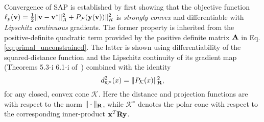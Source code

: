 \newcommand{\coneName}{\mathcal{K}}
\newcommand{\dist}{d}
\newcommand{\cond}{\text{cond}}
\newcommand{\vx}{\mf{v}}
\newcommand{\fx}{\ell_p(\mf{\vx})}

\newcommand{\vy}{\mf{u}}
\newcommand{\fy}{\ell_p(\mf{\vy})}
\newcommand{\vd}{\mf{d}}

\renewcommand\qedsymbol{$\IEEEQED$}

Convergence of SAP is established
by first showing that the objective function 
$\ell_p({\mathbf{v}}) = \frac{1}{2}\Vert{\mathbf{v}}-{\mathbf{v}}^*\Vert_{A}^2 + P_\mathcal{F}({\mathbf{y}}({\mathbf{v}}))\Vert_R^2$
is \emph{strongly convex}
and differentiable with \emph{Lipschitz continuous} gradients.  The
former property is inherited from the positive-definite quadratic term 
provided by the positive definite matrix ${\mathbf{A}}$ in Eq. \eqref{eq:primal_unconstrained}.  The latter is shown using differentiability of the squared-distance function
 and the Lipschitz continuity of its gradient map (Theorems 5.3-i 6.1-i of~\cite{bib:delfour2011shapes})
 combined with the identity
\[
  \dist^2_{\coneName^\circ}(x) = \|P_{\coneName}(x)\|_{\mf{R}}^2,
\] 
for any closed, convex cone $\coneName$. Here 
the distance and projection functions are with respect to the
norm $\|\cdot\|_{\mathbf{R}}$, while $\coneName^\circ$ denotes the polar
cone with respect to the corresponding inner-product ${\mathbf{x}}^T {\mathbf{R}} {\mathbf{y}}$.
